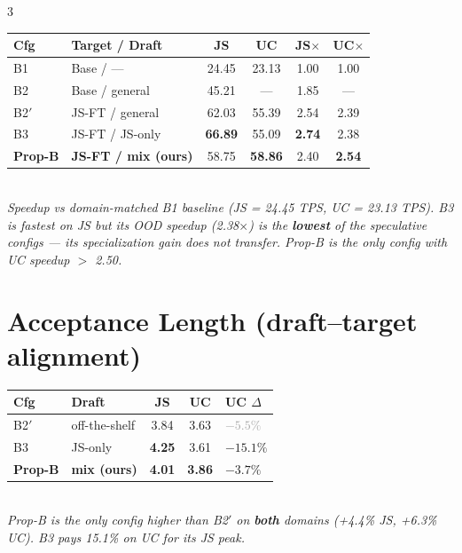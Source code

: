 \documentclass[9pt]{extarticle}
\begin{document}
\begin{multicols}{3}
\small
\begin{tabularx}{\linewidth}{@{}lXcccc@{}}
\toprule
\textbf{Cfg} & \textbf{Target / Draft} & \textbf{JS} & \textbf{UC} & \textbf{JS$\times$} & \textbf{UC$\times$} \\
\midrule
B1     & Base / ---               & 24.45 & 23.13 & 1.00 & 1.00 \\
B2     & Base / general           & 45.21 & ---   & 1.85 & ---  \\
B2$'$  & JS-FT / general          & 62.03 & 55.39 & 2.54 & 2.39 \\
B3     & JS-FT / JS-only          & \textbf{66.89} & 55.09 & \textbf{2.74} & 2.38 \\
\rowcolor{lightgray}\textbf{Prop-B} & \textbf{JS-FT / mix (ours)} & 58.75 & \textbf{58.86} & 2.40 & \textbf{2.54} \\
\bottomrule
\end{tabularx}
\normalsize
\vspace{0.05em}\\
\footnotesize\emph{Speedup vs domain-matched B1 baseline (JS = 24.45 TPS, UC = 23.13 TPS). B3 is fastest on JS but its OOD speedup (2.38$\times$) is the \textbf{lowest} of the speculative configs --- its specialization gain does not transfer. Prop-B is the only config with UC speedup $>$ 2.50.}
\normalsize

\section{Acceptance Length \normalfont\small (draft--target alignment)}

\small
\begin{tabularx}{\linewidth}{@{}lXccX@{}}
\toprule
\textbf{Cfg} & \textbf{Draft} & \textbf{JS} & \textbf{UC} & \textbf{UC $\Delta$} \\
\midrule
B2$'$  & off-the-shelf    & 3.84 & 3.63 & \textcolor{darkgray}{$-5.5\%$} \\
B3     & JS-only          & \textbf{4.25} & 3.61 & \textcolor{accent}{\textbf{$-15.1\%$}} \\
\rowcolor{lightgray}\textbf{Prop-B} & \textbf{mix (ours)} & \textbf{4.01} & \textbf{3.86} & \textcolor{successgreen}{\textbf{$-3.7\%$}} \\
\bottomrule
\end{tabularx}
\normalsize
\vspace{0.05em}\\
\footnotesize\emph{Prop-B is the only config higher than B2$'$ on \textbf{both} domains (+4.4\% JS, +6.3\% UC). B3 pays 15.1\% on UC for its JS peak.}
\normalsize


\end{multicols}
\end{document}
